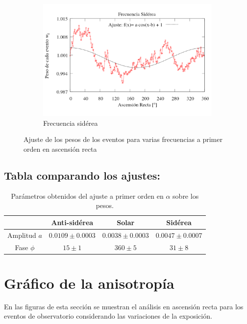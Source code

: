 \begin{figure}[H]
\begin{subfigure}{.75\textwidth}
			\includegraphics[width=\linewidth]{eventos_RA_ajuste_cos_siderea_v2.png}
			\caption{Frecuencia sidérea}
			\label{fig:ajuste_siderea}
		\end{subfigure}%
		\caption{Ajuste de los pesos de los eventos para varias frecuencias a primer orden en ascensión recta}
		\end{figure}
		
	
\subsection{Tabla comparando los ajustes:}
		
		\begin{table}[H]
		\centering
		\begin{tabular}{c|c|c|c}
					& Anti-sidérea			& Solar 				& Sidérea\\ \hline
		Amplitud $a$& $0.0109\pm 0.0003 $ 	&	$0.0038 \pm 0.0003$	&  $0.0047\pm 0.0007$		\\
		Fase $\phi$ & $15    \pm 1$ 		&   $360 \pm 5   $ 		&  $31    \pm 8    $ 		\\
		\end{tabular}
		\caption{Parámetros obtenidos del ajuste a primer orden en $\alpha$ sobre los pesos.}
		\end{table}


\section{Gráfico de la anisotropía}

 En las figuras de esta sección se muestran el análisis en ascensión recta para los eventos de observatorio considerando las variaciones de la exposición.

